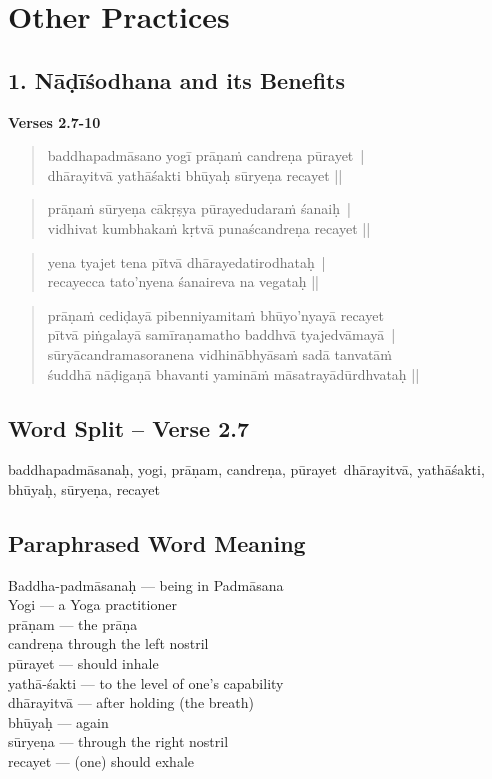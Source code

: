 \section*{Other Practices}

\subsection*{1. Nāḍīśodhana and its Benefits}

\noindent \textbf{Verses 2.7-10}

\begin{verse}
baddhapadmāsano yogī prāṇaṁ candreṇa pūrayet |\\
dhārayitvā yathāśakti bhūyaḥ sūryeṇa recayet ||
\end{verse}

\begin{verse}
prāṇaṁ sūryeṇa cākṛṣya pūrayedudaraṁ śanaiḥ |\\
vidhivat kumbhakaṁ kṛtvā punaścandreṇa recayet ||
\end{verse}

\begin{verse}
yena tyajet tena pītvā dhārayedatirodhataḥ |\\
recayecca tato'nyena śanaireva na vegataḥ ||
\end{verse}

\begin{verse}
prāṇaṁ cediḍayā pibenniyamitaṁ bhūyo'nyayā recayet\\
pītvā piṅgalayā samīraṇamatho baddhvā tyajedvāmayā |\\ 
sūryācandramasoranena vidhinābhyāsaṁ sadā tanvatāṁ\\
śuddhā nāḍigaṇā bhavanti yamināṁ māsatrayādūrdhvataḥ ||
\end{verse}

\subsection*{Word Split – Verse 2.7}


baddhapadmāsanaḥ, yogi, prāṇam, candreṇa, pūrayet dhārayitvā, yathāśakti, bhūyaḥ, sūryeṇa, recayet

\subsection*{Paraphrased Word Meaning}


\begin{multicols}{2}
Baddha-padmāsanaḥ --- being in Padmāsana \\
Yogi --- a Yoga practitioner \\
prāṇam --- the prāṇa \\
candreṇa  through the left nostril \\
pūrayet --- should inhale \\
yathā-śakti --- to the level of one’s capability \\
dhārayitvā --- after holding (the breath)\\
bhūyaḥ --- again \\
sūryeṇa --- through the right nostril \\
recayet --- (one) should exhale 
\end{multicols}

